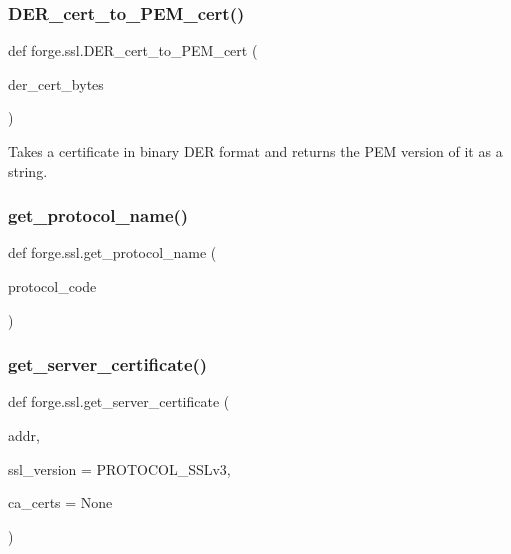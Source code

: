 \subsubsection{\texorpdfstring{D\+E\+R\+\_\+cert\+\_\+to\+\_\+\+P\+E\+M\+\_\+cert()}{DER\_cert\_to\_PEM\_cert()}}
{\footnotesize\ttfamily def forge.\+ssl.\+D\+E\+R\+\_\+cert\+\_\+to\+\_\+\+P\+E\+M\+\_\+cert (\begin{DoxyParamCaption}\item[{}]{der\+\_\+cert\+\_\+bytes }\end{DoxyParamCaption})}

\begin{DoxyVerb}Takes a certificate in binary DER format and returns the
PEM version of it as a string.\end{DoxyVerb}
 \mbox{\label{namespaceforge_1_1ssl_a90c00dd95b4b86d58bfe25634887ba33}} 
\subsubsection{\texorpdfstring{get\+\_\+protocol\+\_\+name()}{get\_protocol\_name()}}
{\footnotesize\ttfamily def forge.\+ssl.\+get\+\_\+protocol\+\_\+name (\begin{DoxyParamCaption}\item[{}]{protocol\+\_\+code }\end{DoxyParamCaption})}

\mbox{\label{namespaceforge_1_1ssl_a41cd286f446f5c9233ef630eb8143ed9}} 
\subsubsection{\texorpdfstring{get\+\_\+server\+\_\+certificate()}{get\_server\_certificate()}}
{\footnotesize\ttfamily def forge.\+ssl.\+get\+\_\+server\+\_\+certificate (\begin{DoxyParamCaption}\item[{}]{addr,  }\item[{}]{ssl\+\_\+version = {\ttfamily PROTOCOL\+\_\+SSLv3},  }\item[{}]{ca\+\_\+certs = {\ttfamily None} }\end{DoxyParamCaption})}

